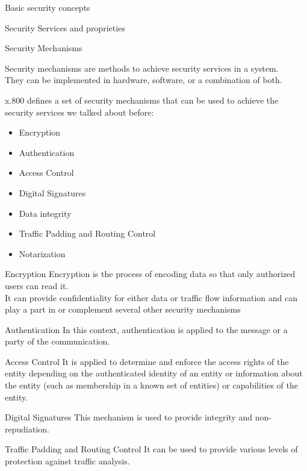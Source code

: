 \begin{section}{Basic security concepts}
\begin{subsection}{Security Services and proprieties}
  \end{subsection}
  \begin{subsection}{Security Mechanisms}
    \begin{boxH}
      Security mechanisms are methods to achieve security services in a system.\\
      They can be implemented in hardware, software, or a combination of both.
    \end{boxH}
    x.800 defines a set of security mechanisms that can be used to achieve the security services
    we talked about before:
    \begin{itemize}
      \item Encryption
      \item Authentication
      \item Access Control
      \item Digital Signatures
    \item Data integrity
    \item Traffic Padding and Routing Control
    \item Notarization
  \end{itemize}
  \begin{paragraph}{Encryption}
    Encryption is the process of encoding data so that only authorized users can read it.\\
    It can provide confidentiality for either data or traffic flow information and can play a part 
    in or complement several other security mechanisms
  \end{paragraph}
  \begin{paragraph}{Authentication}
    In this context, authentication is applied to the message or a party of the communication.\\
  \end{paragraph}
  \begin{paragraph}{Access Control}
    It is applied to determine and enforce the access rights of the entity depending on the 
    authenticated identity of an entity or information about the entity (such as membership in a 
    known set of entities) or capabilities of the entity.
  \end{paragraph}
  \begin{paragraph}{Digital Signatures}
    This mechanism is used to provide integrity and non-repudiation.
  \end{paragraph}
  \begin{paragraph}{Traffic Padding and Routing Control}
    It can be used to provide various levels of protection against traffic analysis.

\end{paragraph}
\end{subsection}
\end{section}
